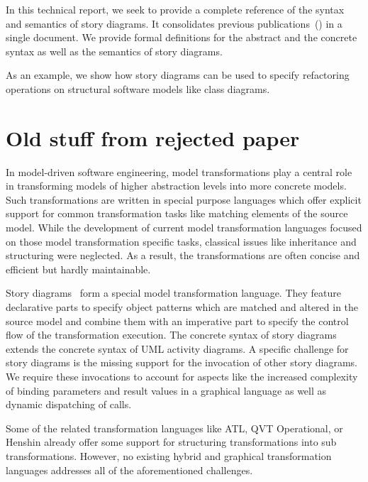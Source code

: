 In this technical report, we seek to provide a complete reference of the syntax and semantics of story diagrams.
It consolidates previous publications~() in a single document.
We provide formal definitions for the abstract and the concrete syntax as well as the semantics of story diagrams.

As an example, we show how story diagrams can be used to specify refactoring operations on structural software models like class diagrams.




\section*{Old stuff from rejected paper}
In model-driven software engineering, model transformations play a central role in transforming models of higher abstraction levels into more concrete models. 
Such transformations are written in special purpose languages which offer explicit support for common transformation tasks like matching elements of the source model.
While the development of current model transformation languages focused on those model transformation specific tasks, classical issues like inheritance and structuring were neglected.
As a result, the transformations are often concise and efficient but hardly maintainable.

Story diagrams~\cite{ZSW99,FNTZ00,Zun01} form a special model transformation language.
They feature declarative parts to specify object patterns which are matched and altered in the source model and combine them with an imperative part to specify the control flow of the transformation execution.
The concrete syntax of story diagrams extends the concrete syntax of UML activity diagrams.
A specific challenge for story diagrams is the missing support for the invocation of other story diagrams.
We require these invocations to account for aspects like the increased complexity of binding parameters and result values in a graphical language as well as dynamic dispatching of calls.

Some of the related transformation languages like ATL, QVT Operational, or Henshin already offer some support for structuring transformations into sub transformations.
However, no existing hybrid and graphical transformation languages addresses all of the aforementioned challenges. 

